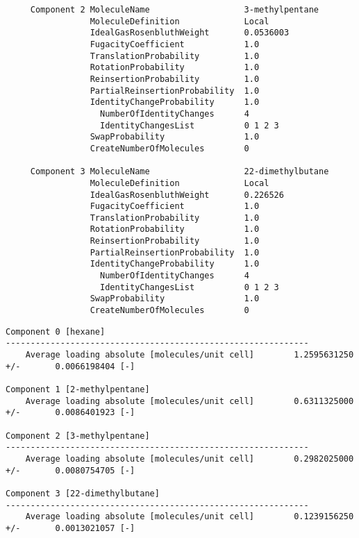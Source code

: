 \begin{tiny}
\begin{verbatim}
     Component 2 MoleculeName                   3-methylpentane
                 MoleculeDefinition             Local
                 IdealGasRosenbluthWeight       0.0536003
                 FugacityCoefficient            1.0
                 TranslationProbability         1.0
                 RotationProbability            1.0
                 ReinsertionProbability         1.0
                 PartialReinsertionProbability  1.0
                 IdentityChangeProbability      1.0
                   NumberOfIdentityChanges      4
                   IdentityChangesList          0 1 2 3
                 SwapProbability                1.0
                 CreateNumberOfMolecules        0

     Component 3 MoleculeName                   22-dimethylbutane
                 MoleculeDefinition             Local
                 IdealGasRosenbluthWeight       0.226526
                 FugacityCoefficient            1.0
                 TranslationProbability         1.0
                 RotationProbability            1.0
                 ReinsertionProbability         1.0
                 PartialReinsertionProbability  1.0
                 IdentityChangeProbability      1.0
                   NumberOfIdentityChanges      4
                   IdentityChangesList          0 1 2 3
                 SwapProbability                1.0
                 CreateNumberOfMolecules        0
\end{verbatim}
\end{tiny}

\begin{tiny}
\begin{verbatim}
Component 0 [hexane]
-------------------------------------------------------------
    Average loading absolute [molecules/unit cell]        1.2595631250 +/-       0.0066198404 [-]

Component 1 [2-methylpentane]
    Average loading absolute [molecules/unit cell]        0.6311325000 +/-       0.0086401923 [-]

Component 2 [3-methylpentane]
-------------------------------------------------------------
    Average loading absolute [molecules/unit cell]        0.2982025000 +/-       0.0080754705 [-]

Component 3 [22-dimethylbutane]
-------------------------------------------------------------
    Average loading absolute [molecules/unit cell]        0.1239156250 +/-       0.0013021057 [-]
\end{verbatim}
\end{tiny}

